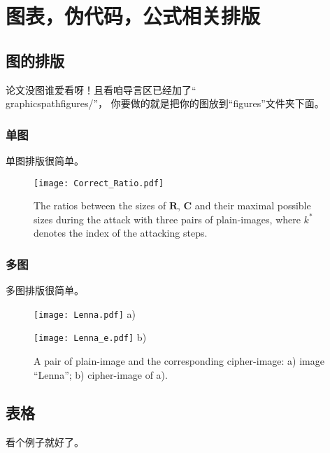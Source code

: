\chapter{图表，伪代码，公式相关排版}\label{elements}

\section{图的排版}
论文没图谁爱看呀！且看咱导言区已经加了``\\graphicspath{{figures/}}''，
你要做的就是把你的图放到``figures''文件夹下面。

\subsection{单图}
单图排版很简单。

\begin{figure}[!htb]
\centering
\begin{minipage}[t]{\oneimage}
\centering
\texttt{[image: Correct\_Ratio.pdf]}
\end{minipage}
\caption{The ratios between the sizes of $\bm{R}$, $\bm{C}$ and their maximal possible sizes during the attack with three pairs of plain-images,
where $k^*$ denotes the index of the attacking steps.}
\label{fig:ratio}
\end{figure}

\subsection{多图}
多图排版很简单。

\begin{figure}[!htb]
\centering
\begin{minipage}[t]{\twoimage}
\centering
\texttt{[image: Lenna.pdf]}
a)
\end{minipage} \hspace{4pt}
\begin{minipage}[t]{\twoimage}
\centering
\texttt{[image: Lenna\_e.pdf]}
b)
\end{minipage}
\caption{A pair of plain-image and the corresponding cipher-image:
a) image ``Lenna''; b) cipher-image of a).}
\label{fig:APairPlaintext}
\end{figure}

\section{表格}
看个例子就好了。

